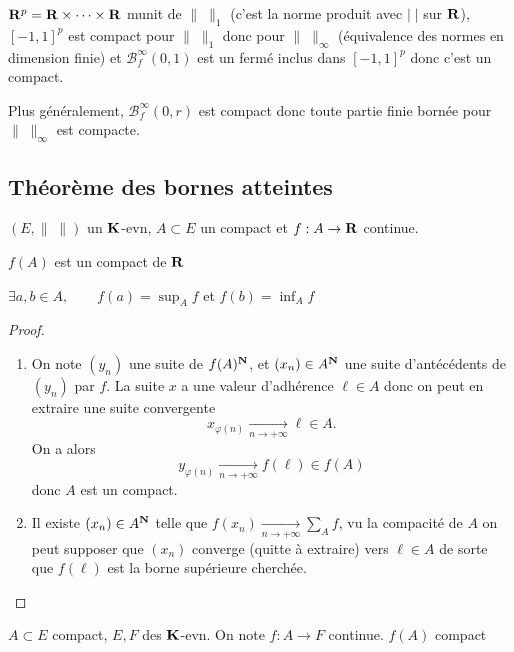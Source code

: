  \begin{rem}
     $\mathbf R^p=\mathbf R\times \cdots \times \mathbf R$ munit de $\|\;\|_1$ (c'est la norme produit avec $|\;|$ sur  $\mathbf R$), $[-1,1]^p$ est compact pour  $\|\;\|_1$ donc pour $\|\;\|_\infty$ (équivalence des normes en dimension finie) et $\mathcal  B_f^\infty(0,1)$ est un fermé inclus dans $[-1,1]^p$ donc c'est un compact.

     Plus généralement,  $\mathcal  B_f^\infty(0,r)$ est compact donc toute partie finie bornée pour $\|\;\|_\infty$ est compacte.
 \end{rem}

 \subsection{Théorème des bornes atteintes}

 \begin{thm}
     \Hyp $(E, \|\;\|)$ un $\mathbf K$-evn, $A\subset E$ un compact et  $f:A\to \mathbf R$ continue.
\begin{concenum}
\item $f(A)$ est un compact de  $\mathbf R$
\item $ \exists  a,b\in A,\quad \quad f(a)=\sup_A\limits f$ et $f(b)=\inf_A\limits f$
\end{concenum}
 \end{thm}

 \begin{proof}~
\begin{enumerate}
    \item On note $(y_n)$ une suite de $f(A)^{\mathbf N}$, et $(x_n)\in A^{\mathbf N}$ une suite d'antécédents de $(y_n)$ par $f$. La suite $x$ a une valeur d'adhérence $\ell  \in  A$ donc on peut en extraire une suite convergente \[
            x_{\varphi(n)} \xrightarrow[n\to+\infty]{}\ell  \in  A.
    \]
    On a alors \[
        y_{\varphi(n)}\xrightarrow[n\to+\infty]{}f(\ell )\in f(A)
    \] 
    donc $A$ est un compact.
\item Il existe  $(x_n)\in A^{\mathbf N}$ telle que $f(x_n)\xrightarrow[n\to+\infty]{}\sum_A\limits f$, vu la compacité de $A$ on peut supposer que  $(x_n)$ converge (quitte à extraire) vers  $\ell  \in A $ de sorte que $f(\ell)$ est la borne supérieure cherchée.
\end{enumerate} 
 \end{proof}

 \begin{prop}
 \Hyp $A\subset E$ compact,  $E,F$ des  $\mathbf K$-evn. On note $f:A\to F$ continue.
 \Conc $f(A)$ compact
 \end{prop}

